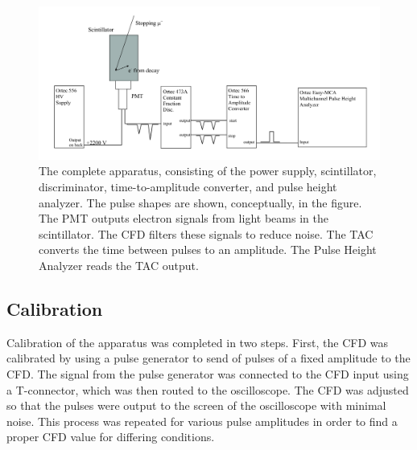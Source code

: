 \documentclass[%
 aip,
 amsmath,amssymb,
 reprint,%
floatfix,
]{revtex4-1}
\begin{document}
\begin{figure}[H]
	\centering
	\includegraphics[scale=0.25]{schematic.png}
	\caption{The complete apparatus, consisting of the power supply, scintillator, discriminator, time-to-amplitude converter, and pulse height analyzer. The pulse shapes are shown, conceptually, in the figure. The PMT outputs electron signals from light beams in the scintillator. The CFD filters these signals to reduce noise. The TAC converts the time between pulses to an amplitude. The Pulse Height Analyzer reads the TAC output.\cite{oxymanual}}
\end{figure}

\subsection{Calibration}

Calibration of the apparatus was completed in two steps. First, the CFD was calibrated by using a pulse generator to send of pulses of a fixed amplitude to the CFD. The signal from the pulse generator was connected to the CFD input using a T-connector, which was then routed to the oscilloscope. The CFD was adjusted so that the pulses were output to the screen of the oscilloscope with minimal noise. This process was repeated for various pulse amplitudes in order to find a proper CFD value for differing conditions.
\end{document}
